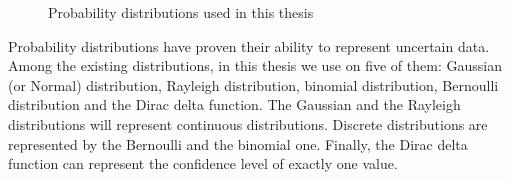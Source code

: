 \begin{figure}
    \centering
    \hfill
    \hfill
    \hfill
    \caption{Probability distributions used in this thesis}
    \label{fig:back:proba:examples}
\end{figure}

Probability distributions have proven their ability to represent uncertain data.
Among the existing distributions, in this thesis we use on five of them: Gaussian (or Normal) distribution, Rayleigh distribution, binomial distribution, Bernoulli distribution and the Dirac delta function.
The Gaussian and the Rayleigh distributions will represent continuous distributions.
Discrete distributions are represented by the Bernoulli and the binomial one.
Finally, the Dirac delta function can represent the confidence level of exactly one value.

